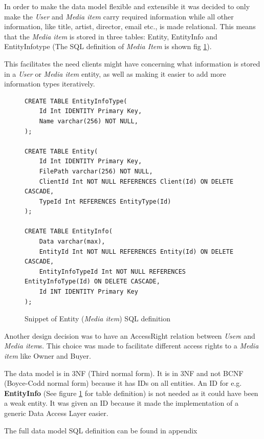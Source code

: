 \documentclass[../report.tex]{subfiles}
\begin{document}
In order to make the data model flexible and extensible it was decided to only make the \textit{User} and \textit{Media item} carry required information while all other information, like title, artist, director, email etc., is made relational. This means that the \textit{Media item} is stored in three tables: Entity, EntityInfo and EntityInfotype (The SQL definition of \textit{Media Item} is shown fig \ref{datamodel}).

This facilitates the need clients might have concerning what information is stored in a \textit{User} or \textit{Media item} entity, as well as making it easier to add more information types iteratively.\\

\begin{figure}[H]
\begin{lstlisting}
CREATE TABLE EntityInfoType(
	Id Int IDENTITY Primary Key,
	Name varchar(256) NOT NULL,
);

CREATE TABLE Entity(
	Id Int IDENTITY Primary Key,
	FilePath varchar(256) NOT NULL,
	ClientId Int NOT NULL REFERENCES Client(Id) ON DELETE CASCADE,
	TypeId Int REFERENCES EntityType(Id)
);

CREATE TABLE EntityInfo(
	Data varchar(max),
	EntityId Int NOT NULL REFERENCES Entity(Id) ON DELETE CASCADE,
	EntityInfoTypeId Int NOT NULL REFERENCES EntityInfoType(Id) ON DELETE CASCADE,
	Id INT IDENTITY Primary Key
);
\end{lstlisting}
\caption{Snippet of Entity (\textit{Media item}) SQL definition}
\label{datamodel}
\end{figure}

Another design decision was to have an AccessRight relation between \textit{User}s and \textit{Media item}s. This choice was made to facilitate different access rights to a \textit{Media item} like Owner and Buyer.

The data model is in 3NF (Third normal form). It is in 3NF and not BCNF (Boyce-Codd normal form) because it has IDs on all entities. An ID for e.g. \textbf{EntityInfo} (See figure \ref{datamodel} for table definition) is not needed as it could have been a weak entity. It was given an ID because it made the implementation of a generic Data Access Layer easier.

The full data model SQL definition can be found in appendix

\end{document}
